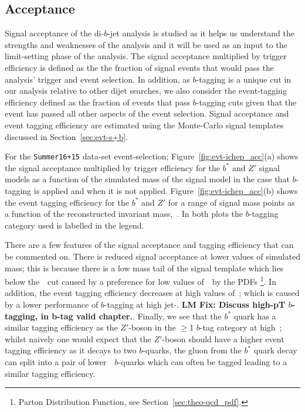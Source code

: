 \subsection{Acceptance}
\label{sec:evt-sel-acc}

Signal acceptance of the di-$b$-jet analysis is studied
as it helps us understand the strengths and weaknesses of the analysis
and it will be used as an input to the limit-setting phase of the analysis.
The signal acceptance multiplied by trigger efficiency is defined as the 
the fraction of signal events that would pass the analysis' trigger and event selection.
In addition, as $b$-tagging is a unique cut in our analysis relative to other dijet searches,
we also consider the event-tagging efficiency defined as the fraction of events that pass
$b$-tagging cuts given that the event has passed all other aspects of the event selection.
Signal acceptance and event tagging efficiency are estimated using the
Monte-Carlo signal templates discussed in Section~\ref{sec:evt-s+b}.

For the \verb|Summer16+15| data-set event-selection;
Figure~\ref{fig:evt-ichep_acc}(a) shows the signal acceptance multiplied by trigger efficiency
for the $b^*$ and $Z'$ signal models
as a function of the simulated mass of the signal model
in the case that $b$-tagging is applied and when it is not applied.
Figure~\ref{fig:evt-ichep_acc}(b) shows the event tagging efficiency
for the $b^*$ and $Z'$ for a range of signal mass points
as a function of the reconstructed invariant mass,~\mjj.
In both plots the $b$-tagging category used is labelled in the legend.

There are a few features of the signal acceptance and tagging efficiency that can be commented on.
There is reduced signal acceptance at lower values of simulated mass;
this is because there is a low mass tail of the signal template which lies below the~\mjj~cut
caused by a preference for low values of~\mjj~by the PDFs
\footnote{Parton Distribution Function, see Section~\ref{sec:theo-qcd_pdf}.}.
In addition, the event tagging efficiency decreases at high values of~\mjj;
which is caused by a lower performance of $b$-tagging at high jet-\pT.
\textbf{LM Fix: Discuss high-pT $b$-tagging, in b-tag valid chapter.}.
Finally, we see that the $b^*$ quark has a similar tagging efficiency
as the $Z'$-boson in the $\geq$1 $b$-tag category at high~\mjj;
whilst naively one would expect that the $Z'$-boson should have a higher
event tagging efficiency as it decays to two $b$-quarks,
the gluon from the $b^*$ quark decay can split into a pair of lower~\pT~$b$-quarks
which can often be tagged leading to a similar tagging efficiency.

